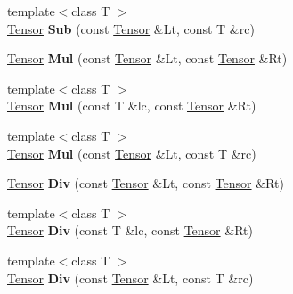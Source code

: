 \begin{DoxyCompactItemize}
\item 
\mbox{\label{namespacecytnx_1_1linalg_a0fa9fc16ad7e8d2685d0acfa25efc479}} 
{\footnotesize template$<$class T $>$ }\\\hyperlink{classcytnx_1_1Tensor}{Tensor} {\bfseries Sub} (const \hyperlink{classcytnx_1_1Tensor}{Tensor} \&Lt, const T \&rc)
\item 
\mbox{\label{namespacecytnx_1_1linalg_a2fc49876b7b53f6f6e97ce70f475f636}} 
\hyperlink{classcytnx_1_1Tensor}{Tensor} {\bfseries Mul} (const \hyperlink{classcytnx_1_1Tensor}{Tensor} \&Lt, const \hyperlink{classcytnx_1_1Tensor}{Tensor} \&Rt)
\item 
\mbox{\label{namespacecytnx_1_1linalg_a2d21f1d35bcecf3e257146540c668779}} 
{\footnotesize template$<$class T $>$ }\\\hyperlink{classcytnx_1_1Tensor}{Tensor} {\bfseries Mul} (const T \&lc, const \hyperlink{classcytnx_1_1Tensor}{Tensor} \&Rt)
\item 
\mbox{\label{namespacecytnx_1_1linalg_a5b2930a8759b8ceb7cd92df6b27bdf24}} 
{\footnotesize template$<$class T $>$ }\\\hyperlink{classcytnx_1_1Tensor}{Tensor} {\bfseries Mul} (const \hyperlink{classcytnx_1_1Tensor}{Tensor} \&Lt, const T \&rc)
\item 
\mbox{\label{namespacecytnx_1_1linalg_abc1940e0e7364299ea1481c81003ba13}} 
\hyperlink{classcytnx_1_1Tensor}{Tensor} {\bfseries Div} (const \hyperlink{classcytnx_1_1Tensor}{Tensor} \&Lt, const \hyperlink{classcytnx_1_1Tensor}{Tensor} \&Rt)
\item 
\mbox{\label{namespacecytnx_1_1linalg_acb8965e9a67906d0c8064725c7d499a8}} 
{\footnotesize template$<$class T $>$ }\\\hyperlink{classcytnx_1_1Tensor}{Tensor} {\bfseries Div} (const T \&lc, const \hyperlink{classcytnx_1_1Tensor}{Tensor} \&Rt)
\item 
\mbox{\label{namespacecytnx_1_1linalg_a9296701c7aad0456965f42b8ea01ad2e}} 
{\footnotesize template$<$class T $>$ }\\\hyperlink{classcytnx_1_1Tensor}{Tensor} {\bfseries Div} (const \hyperlink{classcytnx_1_1Tensor}{Tensor} \&Lt, const T \&rc)

\end{DoxyCompactItemize}
